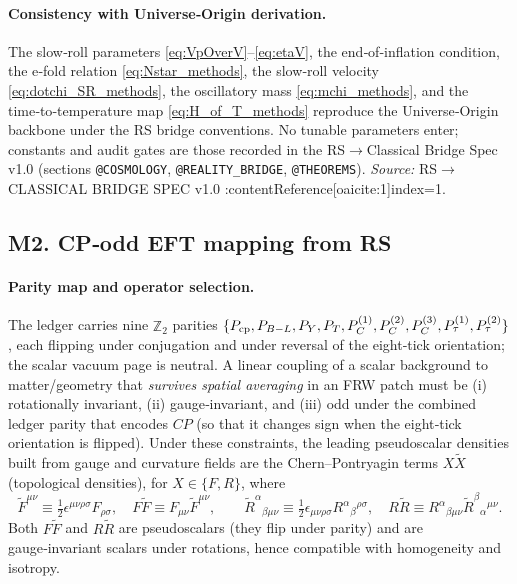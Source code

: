 \documentclass[11pt]{article}
\begin{document}
\paragraph{Consistency with Universe‑Origin derivation.}
The slow‑roll parameters \eqref{eq:VpOverV}–\eqref{eq:etaV}, the end‑of‑inflation condition, the e‑fold relation \eqref{eq:Nstar_methods}, the slow‑roll velocity \eqref{eq:dotchi_SR_methods}, the oscillatory mass \eqref{eq:mchi_methods}, and the time‑to‑temperature map \eqref{eq:H_of_T_methods} reproduce the Universe‑Origin backbone under the RS bridge conventions. No tunable parameters enter; constants and audit gates are those recorded in the RS$\to$Classical Bridge Spec v1.0 (sections \texttt{@COSMOLOGY}, \texttt{@REALITY\_BRIDGE}, \texttt{@THEOREMS}). \emph{Source:} RS$\to$CLASSICAL BRIDGE SPEC v1.0 :contentReference[oaicite:1]{index=1}.

\subsection*{M2. CP‑odd EFT mapping from RS}

\paragraph{Parity map and operator selection.}
The ledger carries nine \(\mathbb{Z}_2\) parities
\(\{P_{\rm cp},P_{B-L},P_Y,P_T,P_C^{(1)},P_C^{(2)},P_C^{(3)},P_\tau^{(1)},P_\tau^{(2)}\}\),
each flipping under conjugation and under reversal of the eight‑tick orientation; the scalar vacuum page is neutral. A linear coupling of a scalar background to matter/geometry that \emph{survives spatial averaging} in an FRW patch must be (i) rotationally invariant, (ii) gauge‑invariant, and (iii) odd under the combined ledger parity that encodes \(CP\) (so that it changes sign when the eight‑tick orientation is flipped). Under these constraints, the leading pseudoscalar densities built from gauge and curvature fields are the Chern–Pontryagin terms \(X\tilde X\) (topological densities), for \(X\in\{F,R\}\), where
\[
  \tilde F^{\mu\nu}\equiv\tfrac12\epsilon^{\mu\nu\rho\sigma}F_{\rho\sigma},\quad
  F\tilde F\equiv F_{\mu\nu}\tilde F^{\mu\nu},\qquad
  \tilde{R}^{\alpha}{}_{\beta\mu\nu}\equiv\tfrac12\epsilon_{\mu\nu\rho\sigma}R^{\alpha}{}_{\beta}{}^{\rho\sigma},\quad
  R\tilde R\equiv R^{\alpha}{}_{\beta\mu\nu}\tilde{R}^{\beta}{}_{\alpha}{}^{\mu\nu}.
\]
Both \(F\tilde F\) and \(R\tilde R\) are pseudoscalars (they flip under parity) and are gauge‑invariant scalars under rotations, hence compatible with homogeneity and isotropy. 
\end{document}
